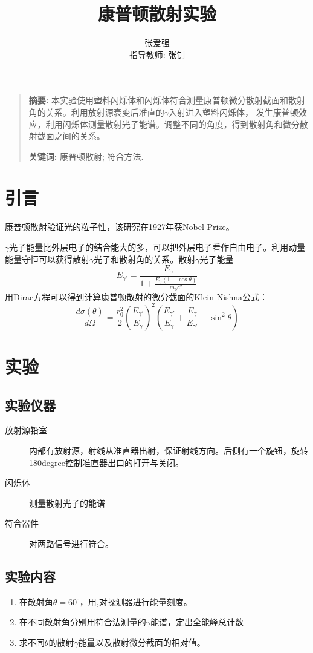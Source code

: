 \documentclass[10pt]{ctexart}
\title{康普顿散射实验}
\author{张爱强\\指导教师: 张钊}
\date{}
\newenvironment{sciabstract}{%
\begin{quote} \textbf{摘要: }}
{\end{quote}}
\begin{document}
\maketitle
\begin{sciabstract}
    本实验使用塑料闪烁体和闪烁体符合测量康普顿微分散射截面和散射角的关系。利用放射源衰变后准直的$\gamma$入射进入塑料闪烁体，
    发生康普顿效应，利用闪烁体测量散射光子能谱。调整不同的角度，得到散射角和微分散射截面之间的关系。
    \par\textbf{关键词: } 康普顿散射; 符合方法.
\end{sciabstract}
\section{引言}
康普顿散射验证光的粒子性，该研究在1927年获Nobel Prize。

$\gamma$光子能量比外层电子的结合能大的多，可以把外层电子看作自由电子。利用动量能量守恒可以获得散射$\gamma$光子和散射角的关系。散射$\gamma$光子能量
\[E_{\gamma'}=\frac{E_\gamma}{1+\frac{E_\gamma(1-\cos{\theta})}{m_0c^2}}\]
用Dirac方程可以得到计算康普顿散射的微分截面的Klein-Nishna公式：
\[\frac{d\sigma(\theta)}{d\Omega}=\frac{r_0^2}{2}(\frac{E_{\gamma'}}{E_\gamma})^2(\frac{E_{\gamma'}}{E_{\gamma}}+\frac{E_{\gamma}}{E_{\gamma'}}+\sin^2{\theta})\]

\section{实验}
\subsection{实验仪器}
\begin{description}
    \item[放射源铅室] 内部有放射源，射线从准直器出射，保证射线方向。后侧有一个旋钮，旋转180\si{degree}控制准直器出口的打开与关闭。 
    \item[闪烁体] 测量散射光子的能谱
    \item[符合器件] 对两路信号进行符合。
\end{description}

\subsection{实验内容}
\begin{enumerate}
    \item 在散射角$\theta=60^\circ$，用,对探测器进行能量刻度。
    \item 在不同散射角分别用符合法测量的$\gamma$能谱，定出全能峰总计数
    \item 求不同$\theta$的散射$\gamma$能量以及散射微分截面的相对值。
\end{enumerate}
\end{document}

